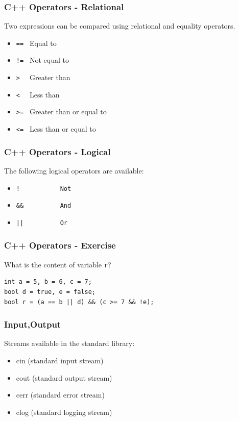 \begin{frame}[fragile]
	\frametitle{C++ Operators - Relational}
	Two expressions can be compared using relational and equality operators.
	\begin{itemize}
	\item \verb|== | Equal to
	\item \verb|!= | Not equal to
	\item \verb|>  | Greater than
	\item \verb|<  | Less than
	\item \verb|>= | Greater than or equal to
	\item \verb|<= | Less than or equal to
	\end{itemize}
\end{frame}

\begin{frame}[fragile]
	\frametitle{C++ Operators - Logical}
	The following logical operators are available:

	\begin{itemize}
	\item \verb|!           Not|
	\item \verb|&&          And|
	\item \begin{verbatim}||          Or\end{verbatim}
	\end{itemize}
\end{frame}

\begin{frame}[fragile]
  \frametitle{C++ Operators - Exercise}
  \begin{exercise}
  What is the content of variable \verb|r|?
\begin{lstlisting}
int a = 5, b = 6, c = 7;
bool d = true, e = false;
bool r = (a == b || d) && (c >= 7 && !e);
\end{lstlisting}
  \end{exercise}
\end{frame}

\begin{frame}[fragile]
  \frametitle{Input,Output}
  Streams available in the standard library:
  \begin{itemize}
  \item cin (standard input stream)
  \item cout (standard output stream)
  \item cerr (standard error stream)
  \item clog (standard logging stream)
  \end{itemize}
\end{frame}

